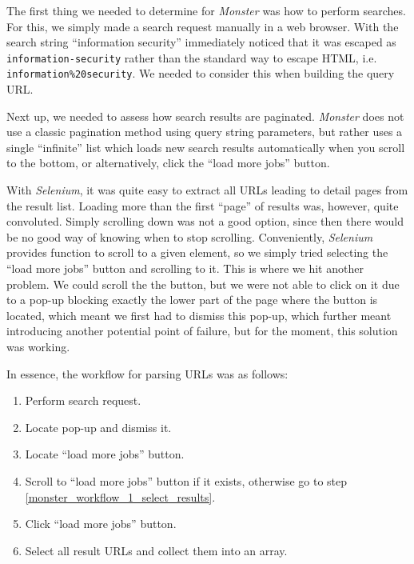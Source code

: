 \documentclass[runningheads]{llncs}
\begin{document}
The first thing we needed to determine for \textit{Monster} was how to perform searches. For this, we simply made a search request manually in a web browser. With the search string “information security” immediately noticed that it was escaped as \texttt{information-security} rather than the standard way to escape HTML, i.e. \texttt{information\%20security}. We needed to consider this when building the query URL.

Next up, we needed to assess how search results are paginated. \textit{Monster} does not use a classic pagination method using query string parameters, but rather uses a single “infinite” list which loads new search results automatically when you scroll to the bottom, or alternatively, click the “load more jobs” button.

With \textit{Selenium}, it was quite easy to extract all URLs leading to detail pages from the result list. Loading more than the first “page” of results was, however, quite convoluted. Simply scrolling down was not a good option, since then there would be no good way of knowing when to stop scrolling. Conveniently, \textit{Selenium} provides function to scroll to a given element, so we simply tried selecting the “load more jobs” button and scrolling to it. This is where we hit another problem. We could scroll the the button, but we were not able to click on it due to a pop-up blocking exactly the lower part of the page where the button is located, which meant we first had to dismiss this pop-up, which further meant introducing another potential point of failure, but for the moment, this solution was working.

In essence, the workflow for parsing URLs was as follows:

\begin{enumerate}
  \item Perform search request.
  \item Locate pop-up and dismiss it.
  \item Locate “load more jobs” button.
  \item \label{monster_workflow_1_scroll_to_button}
    Scroll to “load more jobs” button if it exists, otherwise go to step \ref{monster_workflow_1_select_results}.
  \item \label{monster_workflow_1_click_button}
    Click “load more jobs” button.
  \item \label{monster_workflow_1_select_results}
    Select all result URLs and collect them into an array.
\end{enumerate}
\end{document}
